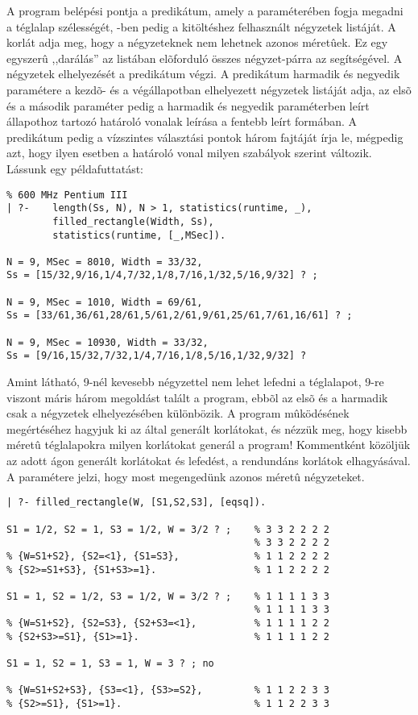 A program belépési pontja a  predikátum, amely
a  paraméterében fogja megadni a téglalap szélességét, -ben
pedig a kitöltéshez felhasznált négyzetek listáját. A 
korlát adja meg, hogy a négyzeteknek nem lehetnek azonos méretûek. Ez egy
egyszerû ,,darálás'' az  listában elõforduló összes négyzet-párra
az  segítségével. A négyzetek elhelyezését a 
predikátum végzi. A predikátum harmadik és negyedik paramétere a kezdõ-
és a végállapotban elhelyezett négyzetek listáját adja, az elsõ és a második
paraméter pedig a harmadik és negyedik paraméterben leírt állapothoz tartozó
határoló vonalak leírása a fentebb leírt formában. A 
predikátum pedig a vízszintes választási pontok három fajtáját írja le,
mégpedig azt, hogy ilyen esetben a határoló vonal milyen szabályok szerint
változik.
\br
Lássunk egy példafuttatást:
\begin{verbatim}
% 600 MHz Pentium III
| ?-    length(Ss, N), N > 1, statistics(runtime, _),
        filled_rectangle(Width, Ss), 
        statistics(runtime, [_,MSec]).

N = 9, MSec = 8010, Width = 33/32,
Ss = [15/32,9/16,1/4,7/32,1/8,7/16,1/32,5/16,9/32] ? ;

N = 9, MSec = 1010, Width = 69/61,
Ss = [33/61,36/61,28/61,5/61,2/61,9/61,25/61,7/61,16/61] ? ;

N = 9, MSec = 10930, Width = 33/32,
Ss = [9/16,15/32,7/32,1/4,7/16,1/8,5/16,1/32,9/32] ? 
\end{verbatim}
Amint látható, 9-nél kevesebb négyzettel nem lehet lefedni a téglalapot,
9-re viszont máris három megoldást talált a program, ebbõl az elsõ és
a harmadik csak a négyzetek elhelyezésében különbözik.
\br
A program mûködésének megértéséhez hagyjuk ki az  által
generált korlátokat, és nézzük meg, hogy kisebb méretû téglalapokra milyen
korlátokat generál a program! Kommentként közöljük az adott ágon generált
korlátokat és lefedést, a rendundáns korlátok elhagyásával. A
 \cd{[eqsq]} paramétere jelzi, hogy most megengedünk
azonos méretû négyzeteket.
\begin{verbatim}
| ?- filled_rectangle(W, [S1,S2,S3], [eqsq]).

S1 = 1/2, S2 = 1, S3 = 1/2, W = 3/2 ? ;    % 3 3 2 2 2 2
                                           % 3 3 2 2 2 2
% {W=S1+S2}, {S2=<1}, {S1=S3},             % 1 1 2 2 2 2
% {S2>=S1+S3}, {S1+S3>=1}.                 % 1 1 2 2 2 2

S1 = 1, S2 = 1/2, S3 = 1/2, W = 3/2 ? ;    % 1 1 1 1 3 3
                                           % 1 1 1 1 3 3
% {W=S1+S2}, {S2=S3}, {S2+S3=<1},          % 1 1 1 1 2 2
% {S2+S3>=S1}, {S1>=1}.                    % 1 1 1 1 2 2

S1 = 1, S2 = 1, S3 = 1, W = 3 ? ; no

% {W=S1+S2+S3}, {S3=<1}, {S3>=S2},         % 1 1 2 2 3 3 
% {S2>=S1}, {S1>=1}.                       % 1 1 2 2 3 3 
\end{verbatim}

